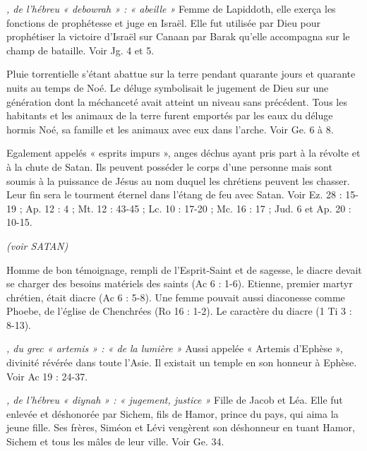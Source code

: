 \begin{multicols}{2}
\textit{, de l'hébreu « debowrah » : « abeille »}\newline
Femme de Lapiddoth, elle exerça les fonctions de prophétesse et juge en Israël. Elle fut utilisée par Dieu pour prophétiser la victoire d’Israël sur Canaan par Barak qu’elle accompagna sur le champ de bataille. Voir Jg. 4 et 5.

\textit{}\newline
Pluie torrentielle s’étant abattue sur la terre pendant quarante jours et quarante nuits au temps de Noé. Le déluge symbolisait le jugement de Dieu sur une génération dont la méchanceté avait atteint un niveau sans précédent. Tous les habitants et les animaux de la terre furent emportés par les eaux du déluge hormis Noé, sa famille et les animaux avec eux dans l’arche. Voir Ge. 6 à 8.

\textit{}\newline
Egalement appelés « esprits impurs », anges déchus ayant pris part à la révolte et à la chute de Satan. Ils peuvent posséder le corps d'une personne mais sont soumis à la puissance de Jésus au nom duquel les chrétiens peuvent les chasser. Leur fin sera le tourment éternel dans l’étang de feu avec Satan. Voir Ez. 28 : 15-19 ; Ap. 12 : 4 ; Mt. 12 : 43-45 ; Lc. 10 : 17-20 ; Mc. 16 : 17 ; Jud. 6 et Ap. 20 : 10-15.

\textit{(voir SATAN)}\newline

\textit{}\newline
Homme de bon témoignage, rempli de l'Esprit-Saint et de sagesse, le diacre devait se charger des besoins matériels des saints (Ac 6 : 1-6). Etienne, premier martyr chrétien, était diacre (Ac 6 : 5-8). Une femme pouvait aussi diaconesse comme Phoebe, de l'église de Chenchrées (Ro 16 : 1-2). Le caractère du diacre (1 Ti 3 : 8-13).

\textit{, du grec « artemis » : « de la lumière »}\newline
Aussi appelée « Artemis d’Ephèse », divinité révérée dans toute l’Asie. Il existait un temple en son honneur à Ephèse. Voir Ac 19 : 24-37.

\textit{, de l'hébreu « diynah » : « jugement, justice »}\newline
Fille de Jacob et Léa. Elle fut enlevée et déshonorée par Sichem, fils de Hamor, prince du pays, qui aima la jeune fille. Ses frères, Siméon et Lévi vengèrent son déshonneur en tuant Hamor, Sichem et tous les mâles de leur ville. Voir Ge. 34.


\end{multicols}
